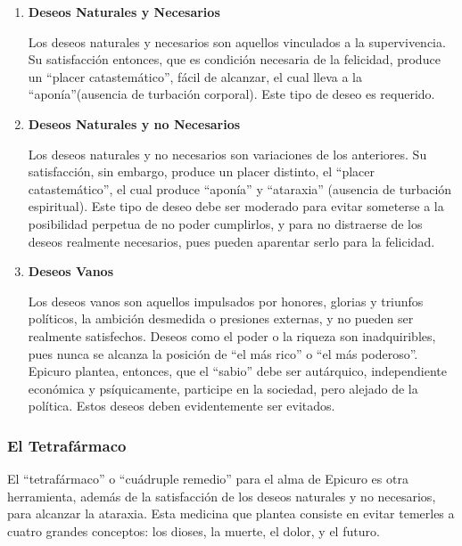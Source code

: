 \documentclass{article}
\begin{document}
\begin{enumerate}
    \item \textbf{Deseos Naturales y Necesarios}
    
    Los deseos naturales y necesarios son aquellos vinculados a la supervivencia. Su satisfacción entonces, que es condición necesaria de la felicidad, produce un ``placer catastemático'', fácil de alcanzar, el cual lleva a la ``aponía''(ausencia de turbación corporal). Este tipo de deseo es requerido.

    \item \textbf{Deseos Naturales y no Necesarios}
    
    Los deseos naturales y no necesarios son variaciones de los anteriores. Su satisfacción, sin embargo, produce un placer distinto, el ``placer catastemático'', el cual produce ``aponía'' y ``ataraxia'' (ausencia de turbación espiritual). Este tipo de deseo debe ser moderado para evitar someterse a la posibilidad perpetua de no poder cumplirlos, y para no distraerse de los deseos realmente necesarios, pues pueden aparentar serlo para la felicidad.

    \item \textbf{Deseos Vanos}
    
    Los deseos vanos son aquellos impulsados por honores, glorias y triunfos políticos, la ambición desmedida o presiones externas, y no pueden ser realmente satisfechos. Deseos como el poder o la riqueza son inadquiribles, pues nunca se alcanza la posición de ``el más rico'' o ``el más poderoso''. Epicuro plantea, entonces, que el ``sabio'' debe ser autárquico, independiente económica y psíquicamente, participe en la sociedad, pero alejado de la política. Estos deseos deben evidentemente ser evitados.
\end{enumerate}

\subsubsection{El Tetrafármaco}

El ``tetrafármaco'' o ``cuádruple remedio'' para el alma de Epicuro es otra herramienta, además de la satisfacción de los deseos naturales y no necesarios, para alcanzar la ataraxia. Esta medicina que plantea consiste en evitar temerles a cuatro grandes conceptos: los dioses, la muerte, el dolor, y el futuro.
\end{document}
